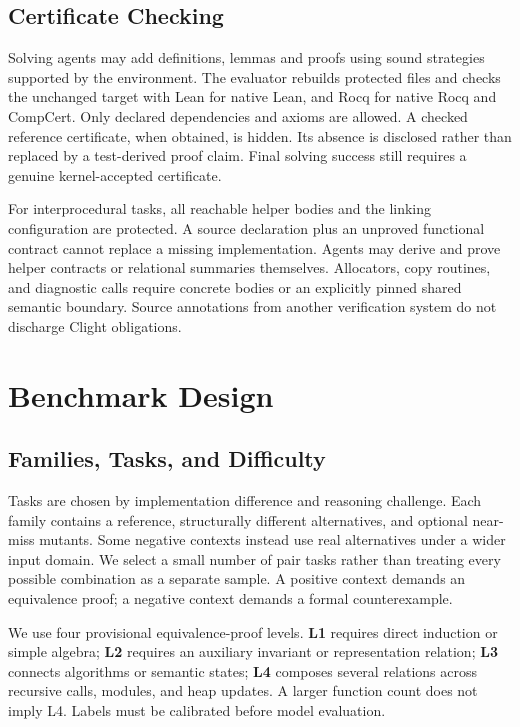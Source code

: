 \documentclass{article}
\begin{document}
\subsection{Certificate Checking}

Solving agents may add definitions, lemmas and proofs using sound strategies supported by the environment. The evaluator rebuilds protected files and checks the unchanged target with Lean for native Lean, and Rocq for native Rocq and CompCert. Only declared dependencies and axioms are allowed. A checked reference certificate, when obtained, is hidden. Its absence is disclosed rather than replaced by a test-derived proof claim. Final solving success still requires a genuine kernel-accepted certificate.

For interprocedural tasks, all reachable helper bodies and the linking configuration are protected. A source declaration plus an unproved functional contract cannot replace a missing implementation. Agents may derive and prove helper contracts or relational summaries themselves. Allocators, copy routines, and diagnostic calls require concrete bodies or an explicitly pinned shared semantic boundary. Source annotations from another verification system do not discharge Clight obligations.

\section{Benchmark Design}

\subsection{Families, Tasks, and Difficulty}

Tasks are chosen by implementation difference and reasoning challenge. Each family contains a reference, structurally different alternatives, and optional near-miss mutants. Some negative contexts instead use real alternatives under a wider input domain. We select a small number of pair tasks rather than treating every possible combination as a separate sample. A positive context demands an equivalence proof; a negative context demands a formal counterexample.

We use four provisional equivalence-proof levels. \textbf{L1} requires direct induction or simple algebra; \textbf{L2} requires an auxiliary invariant or representation relation; \textbf{L3} connects algorithms or semantic states; \textbf{L4} composes several relations across recursive calls, modules, and heap updates. A larger function count does not imply L4. Labels must be calibrated before model evaluation.
\end{document}
